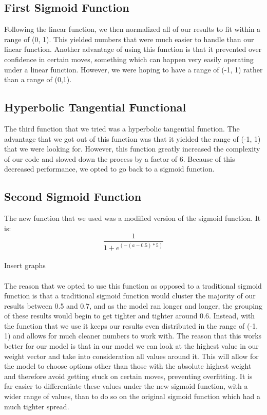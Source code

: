 \documentclass{article}
\begin{document}
\subsection{First Sigmoid Function}
Following the linear function, we then normalized all of our results to fit within a range of (0, 1). This yielded numbers that were much easier to handle than our linear function. Another advantage of using this function is that it prevented over confidence in certain moves, something which can happen very easily operating under a linear function. However, we were hoping to have a range of (-1, 1) rather than a range of (0,1).

\subsection{Hyperbolic Tangential Functional}
The third function that we tried was a hyperbolic tangential function. The advantage that we got out of this function was that it yielded the range of (-1, 1) that we were looking for. However, this function greatly increased the complexity of our code and slowed down the process by a factor of 6. Because of this decreased performance, we opted to go back to a sigmoid function.

\subsection{Second Sigmoid Function}
The new function that we used was a modified version of the sigmoid function. It is:
\[\frac{1}{1 + e^{(-(a-0.5) * 5)}}\]
\\
Insert graphs \\ \\

The reason that we opted to use this function as opposed to a traditional sigmoid function is that a traditional sigmoid function would cluster the majority of our results between 0.5 and 0.7, and as the model ran longer and longer, the grouping of these results would begin to get tighter and tighter around 0.6. Instead, with the function that we use it keeps our results even distributed in the range of (-1, 1) and allows for much cleaner numbers to work with. The reason that this works better for our model is that in our model we can look at the highest value in our weight vector and take into consideration all values around it. This will allow for the model to choose options other than those with the absolute highest weight and therefore avoid getting stuck on certain moves, preventing overfitting. It is far easier to differentiate these values under the new sigmoid function, with a wider range of values, than to do so on the original sigmoid function which had a much tighter spread.
\end{document}
